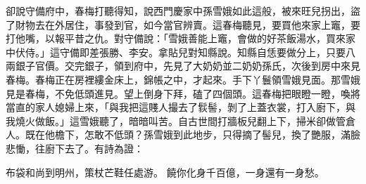 卻說守備府中，春梅打聽得知，說西門慶家中孫雪娥如此這般，被來旺兒拐出，盜了財物去在外居住，事發到官，如今當官辨賣。這春梅聽見，要買他來家上竈，要打他嘴，以報平昔之仇。對守備說：「雪娥善能上竈，會做的好茶飯湯水，買來家中伏侍。」這守備即差張勝、李安。拿貼兒對知縣說。知縣自恁要做分上，只要八兩銀子官價。交完銀子，領到府中，先見了大奶奶並二奶奶孫氏，次後到房中來見春梅。春梅正在房裡縷金床上，錦帳之中，才起來。手下丫鬟領雪娥見面。那雪娥見是春梅，不免低頭進見。望上倒身下拜，磕了四個頭。這春梅把眼瞪一瞪，喚將當直的家人媳婦上來，「與我把這賤人撮去了䯼髻，剝了上蓋衣裳，打入廚下，與我燒火做飯。」這雪娥聽了，暗暗叫苦。自古世間打牆板兒翻上下，掃米卻做管倉人。既在他檐下，怎敢不低頭？孫雪娥到此地步，只得摘了髻兒，換了艷服，滿臉悲慟，往廚下去了。有詩為證：

布袋和尚到明州，策杖芒鞋任處游。
饒你化身千百億，一身還有一身愁。

